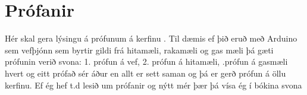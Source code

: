 \section{Prófanir}
Hér skal gera lýsingu á prófunum á kerfinu . Til dæmis ef þið eruð með Arduino sem vefþjónn sem byrtir gildi frá hitamæli, rakamæli og gas mæli þá gæti prófunin verið svona: 1. prófun á vef, 2. prófun á hitamæli, .prófun á gasmæli hvert og eitt prófað sér áður en allt er sett saman og þá er gerð prófun á öllu kerfinu.
Ef ég hef t.d lesið um prófanir og nýtt mér þær þá vísa ég í bókina svona  \cite{pohl2010requirements}

